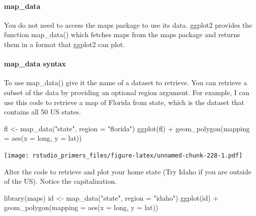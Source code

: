 \documentclass[
]{article}
\newenvironment{Shaded}{\begin{snugshade}}{\end{snugshade}}
\newcommand{\AttributeTok}[1]{\textcolor[rgb]{0.77,0.63,0.00}{#1}}
\newcommand{\FunctionTok}[1]{\textcolor[rgb]{0.00,0.00,0.00}{#1}}
\newcommand{\NormalTok}[1]{#1}
\newcommand{\OtherTok}[1]{\textcolor[rgb]{0.56,0.35,0.01}{#1}}
\newcommand{\SpecialCharTok}[1]{\textcolor[rgb]{0.00,0.00,0.00}{#1}}
\newcommand{\StringTok}[1]{\textcolor[rgb]{0.31,0.60,0.02}{#1}}
\begin{document}
\hypertarget{map_data}{%
\paragraph{map\_data}\label{map_data}}

You do not need to access the maps package to use its data. ggplot2
provides the function map\_data() which fetches maps from the maps
package and returns them in a format that ggplot2 can plot.

\hypertarget{map_data-syntax}{%
\paragraph{map\_data syntax}\label{map_data-syntax}}

To use map\_data() give it the name of a dataset to retrieve. You can
retrieve a subset of the data by providing an optional region argument.
For example, I can use this code to retrieve a map of Florida from
state, which is the dataset that contains all 50 US states.

\begin{Shaded}
\begin{Highlighting}[]
\NormalTok{fl }\OtherTok{\textless{}{-}} \FunctionTok{map\_data}\NormalTok{(}\StringTok{"state"}\NormalTok{, }\AttributeTok{region =} \StringTok{"florida"}\NormalTok{)}
\FunctionTok{ggplot}\NormalTok{(fl) }\SpecialCharTok{+}
  \FunctionTok{geom\_polygon}\NormalTok{(}\AttributeTok{mapping =} \FunctionTok{aes}\NormalTok{(}\AttributeTok{x =}\NormalTok{ long, }\AttributeTok{y =}\NormalTok{ lat))}
\end{Highlighting}
\end{Shaded}

\texttt{[image: rstudio\_primers\_files/figure-latex/unnamed-chunk-228-1.pdf]}

Alter the code to retrieve and plot your home state (Try Idaho if you
are outside of the US). Notice the capitalization.

\begin{Shaded}
\begin{Highlighting}[]
\FunctionTok{library}\NormalTok{(maps)}
\NormalTok{id }\OtherTok{\textless{}{-}} \FunctionTok{map\_data}\NormalTok{(}\StringTok{"state"}\NormalTok{, }\AttributeTok{region =} \StringTok{"idaho"}\NormalTok{)}
\FunctionTok{ggplot}\NormalTok{(id) }\SpecialCharTok{+}
  \FunctionTok{geom\_polygon}\NormalTok{(}\AttributeTok{mapping =} \FunctionTok{aes}\NormalTok{(}\AttributeTok{x =}\NormalTok{ long, }\AttributeTok{y =}\NormalTok{ lat))}
\end{Highlighting}
\end{Shaded}
\end{document}
